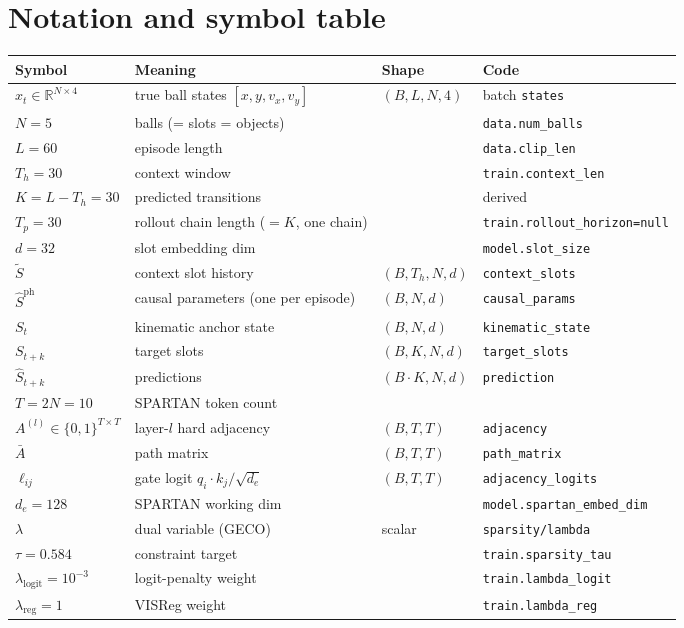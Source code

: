 \documentclass[11pt]{article}
\newcommand{\code}[1]{\texttt{\small #1}}
\newcommand{\Sph}{\hat{S}^{\mathrm{ph}}}
\newcommand{\Abar}{\bar{A}}
\begin{document}
\section{Notation and symbol table}
\begin{center}\small
\begin{tabular}{llll}
\toprule
Symbol & Meaning & Shape & Code \\
\midrule
$x_t \in \mathbb{R}^{N\times 4}$ & true ball states $[x,y,v_x,v_y]$ & $(B,L,N,4)$ & batch \code{states} \\
$N=5$ & balls (= slots = objects) & & \code{data.num\_balls} \\
$L=60$ & episode length & & \code{data.clip\_len} \\
$T_h=30$ & context window & & \code{train.context\_len} \\
$K=L-T_h=30$ & predicted transitions & & derived \\
$T_p=30$ & rollout chain length ($=K$, one chain) & & \code{train.rollout\_horizon=null} \\
$d=32$ & slot embedding dim & & \code{model.slot\_size} \\
$\tilde S$ & context slot history & $(B,T_h,N,d)$ & \code{context\_slots} \\
$\Sph$ & causal parameters (one per episode) & $(B,N,d)$ & \code{causal\_params} \\
$S_t$ & kinematic anchor state & $(B,N,d)$ & \code{kinematic\_state} \\
$S_{t+k}$ & target slots & $(B,K,N,d)$ & \code{target\_slots} \\
$\hat S_{t+k}$ & predictions & $(B\!\cdot\!K,N,d)$ & \code{prediction} \\
$T = 2N = 10$ & SPARTAN token count & & \\
$A^{(l)} \in \{0,1\}^{T\times T}$ & layer-$l$ hard adjacency & $(B,T,T)$ & \code{adjacency} \\
$\Abar$ & path matrix & $(B,T,T)$ & \code{path\_matrix} \\
$\ell_{ij}$ & gate logit $q_i\!\cdot\!k_j/\sqrt{d_e}$ & $(B,T,T)$ & \code{adjacency\_logits} \\
$d_e=128$ & SPARTAN working dim & & \code{model.spartan\_embed\_dim} \\
$\lambda$ & dual variable (GECO) & scalar & \code{sparsity/lambda} \\
$\tau=0.584$ & constraint target & & \code{train.sparsity\_tau} \\
$\lambda_{\mathrm{logit}}=10^{-3}$ & logit-penalty weight & & \code{train.lambda\_logit} \\
$\lambda_{\mathrm{reg}}=1$ & VISReg weight & & \code{train.lambda\_reg} \\
\bottomrule
\end{tabular}
\end{center}
\end{document}
